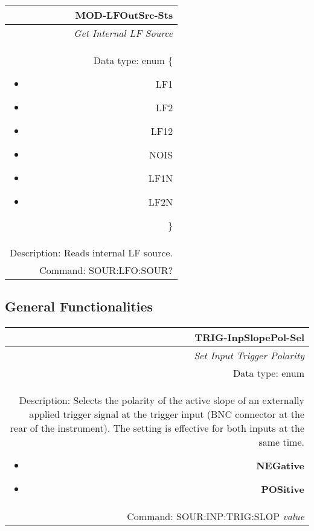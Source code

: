 \documentclass[openany]{article}
\begin{document}
		\begin{tabular}{N}
			\hline
			\bfseries MOD-LFOutSrc-Sts \\ \hline
			\emph{Get Internal LF Source} \\
			Data type: enum \{\begin{itemize}[noitemsep]
				\small
				\item[] LF1
				\item[] LF2
				\item[] LF12
				\item[] NOIS
				\item[] LF1N
				\item[] LF2N

			\end{itemize}\} \\ 
			Description: Reads internal LF source. \\
			Command: SOUR:LFO:SOUR? \\

		\end{tabular}
%

	\subsection{General Functionalities}\label{pvgroup:function} %

		\paragraph{} %

%
		\begin{tabular}{N}
			\hline
			\bfseries TRIG-InpSlopePol-Sel \\ \hline
			\emph{Set Input Trigger Polarity} \\
			Data type: enum \\   
			Description: Selects the polarity of the active slope of an externally applied trigger signal at the trigger input (BNC connector at the rear of the instrument). The setting is effective for both inputs at the same time.\begin{itemize}[noitemsep]
				\small
				\item[] \textbf{NEGative}
                                \item[] \textbf{POSitive}
			\end{itemize} \\
			Command: SOUR:INP:TRIG:SLOP \emph{value} \\

		\end{tabular}
\end{document}
